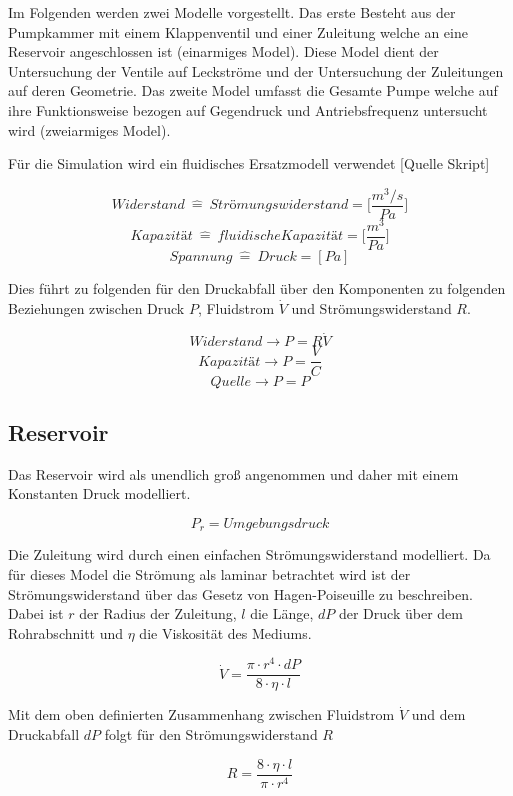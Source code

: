\documentclass[fontsize=12pt, a4paper]{scrartcl}
\begin{document}
Im Folgenden werden zwei Modelle vorgestellt. Das erste Besteht aus der Pumpkammer mit einem Klappenventil und einer Zuleitung welche an eine Reservoir angeschlossen ist (einarmiges Model). Diese Model dient der Untersuchung der Ventile auf Leckströme und der Untersuchung der Zuleitungen auf deren Geometrie. Das zweite Model umfasst die Gesamte Pumpe welche auf ihre Funktionsweise bezogen auf Gegendruck und Antriebsfrequenz untersucht wird (zweiarmiges Model).

Für die Simulation wird ein fluidisches Ersatzmodell verwendet [Quelle Skript]

\[ Widerstand \:\widehat{=}\:  Strömungswiderstand = \biggl[\frac{m^3/s}{Pa}\biggr] \]
\[ Kapazität  \:\widehat{=}\:  fluidische Kapazität = \biggl[\frac{m^3}{Pa}\biggr] \]
\[ Spannung  \:\widehat{=}\:  Druck = [Pa] \]

Dies führt zu folgenden für den Druckabfall über den Komponenten zu folgenden Beziehungen zwischen Druck \(P\), Fluidstrom \(\dot{V}\) und Strömungswiderstand \(R\).

\[Widerstand \rightarrow P = R\dot{V} \]
\[Kapazität \rightarrow P = \frac{V}{C} \]
\[Quelle \rightarrow P = P \]

\subsection{Reservoir}
Das Reservoir wird als unendlich groß angenommen und daher mit einem Konstanten Druck modelliert.


\[ P_r = Umgebungsdruck \]

Die Zuleitung wird durch einen einfachen Strömungswiderstand modelliert. Da für dieses Model die Strömung als laminar betrachtet wird ist der Strömungswiderstand über das Gesetz von Hagen-Poiseuille zu beschreiben. Dabei ist \( r \) der Radius der Zuleitung, \(l\) die Länge, \(dP\) der Druck über dem Rohrabschnitt und \(\eta\) die Viskosität des Mediums.

\begin{equation}
	\dot{V} = \frac{\pi \cdot r^4 \cdot dP}{8 \cdot \eta \cdot l}
\end{equation}

Mit dem oben definierten Zusammenhang zwischen Fluidstrom \(\dot{V}\) und dem Druckabfall \(dP\) folgt für den Strömungswiderstand \(R\)

\begin{equation}
	R = \frac{8 \cdot \eta \cdot l}{\pi \cdot r^4}
\end{equation}
\end{document}
